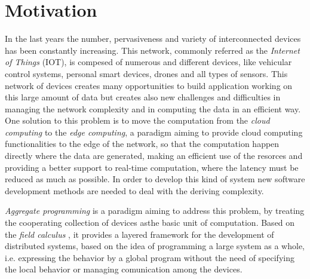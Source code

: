 \section{Motivation}
In the last years the number, pervasiveness and variety of interconnected devices has been constantly increasing. This network, commonly referred as the \textit{Internet of Things} (IOT), is compesed of numerous and different devices, like vehicular control systems, personal smart devices, drones and all types of sensors. This network of devices creates many opportunities to build application working on this large amount of data but creates also new challenges and difficulties in managing the network complexity and in computing the data in an efficient way. One solution to this problem is to move the computation from the \textit{cloud computing} to the \textit{edge computing}, a paradigm aiming to provide cloud computing functionalities to the edge of the network, so that the computation happen directly where the data are generated, making an efficient use of the resorces and providing a better support to real-time computation, where the latency must be reduced as much as possible. In order to develop this kind of system new software development methods are needed to deal with the deriving complexity.

\textit{Aggregate programming} \cite{Aggregate01} is a paradigm aiming to address this problem, by treating the cooperating collection of devices asthe basic unit of computation. Based on the \textit{field calculus} \cite{FieldCalculus}, it provides a layered framework for the development of distributed systems, based on the idea of programming a large system as a whole, i.e. expressing the behavior by a global program without the need of specifying the local behavior or managing comunication among the devices.

